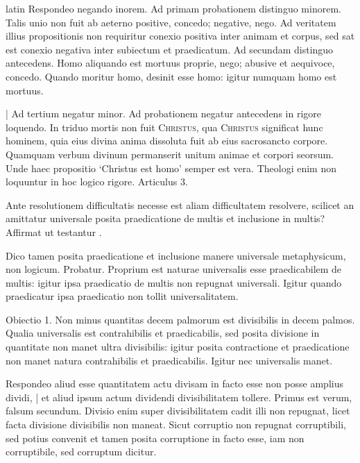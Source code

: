 \begin{otherlanguage*}{latin}
\pstart
Respondeo negando inorem. Ad primam probationem distinguo minorem. Talis unio non fuit ab aeterno positive, concedo; negative, nego. Ad veritatem illius propositionis non requiritur conexio positiva inter animam et corpus, sed sat est conexio negativa inter subiectum et praedicatum. Ad secundam distinguo antecedens. Homo aliquando est mortuus proprie, nego; abusive et aequivoce, concedo. Quando moritur homo, desinit esse homo:
igitur numquam homo est mortuus. 
\pend

\pstart
\textnormal{|} Ad tertium negatur minor. Ad probationem negatur antecedens in rigore loquendo. In triduo mortis non fuit \textsc{Christus}, qua \textsc{Christus} significat hunc hominem, quia eius divina anima dissoluta fuit ab eius sacrosancto corpore. Quamquam verbum divinum permanserit unitum animae et corpori seorsum. Unde haec propositio `Christus est homo' semper est vera. Theologi enim non loquuntur in hoc logico rigore. Articulus 3. 
\pend

\pstart
Ante resolutionem difficultatis necesse est aliam difficultatem resolvere, scilicet an amittatur universale posita praedicatione de multis et inclusione in multis? Affirmat  ut testantur . 
\pend

\pstart
Dico tamen posita praedicatione et inclusione manere universale metaphysicum, non logicum. Probatur. Proprium est naturae universalis esse praedicabilem de multis:
igitur ipsa praedicatio de multis non repugnat universali. Igitur quando praedicatur ipsa praedicatio non tollit universalitatem. 
\pend

\pstart
Obiectio 1. Non minus quantitas decem palmorum est divisibilis in decem palmos. Qualia universalis est contrahibilis et praedicabilis, sed posita divisione in quantitate non manet ultra divisibilis:
igitur posita contractione et praedicatione non manet natura contrahibilis et praedicabilis. Igitur nec universalis manet. 
\pend

\pstart
Respondeo aliud esse quantitatem actu divisam in facto esse non posse amplius dividi, \textnormal{|} et aliud ipsum actum dividendi divisibilitatem tollere. Primus est verum, falsum secundum. Divisio enim super divisibilitatem cadit illi non repugnat, licet facta divisione divisibilis non maneat. Sicut corruptio non repugnat corruptibili, sed potius convenit et tamen posita corruptione in facto esse, iam non corruptibile, sed corruptum dicitur. 
\pend


\end{otherlanguage*}
